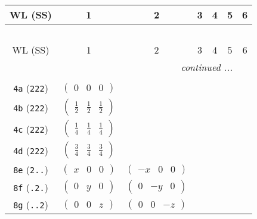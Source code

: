 \documentclass[fleqn,9pt,landscape]{jsarticle}
\begin{document}
\begin{center}
\renewcommand{\arraystretch}{1.2}
\begin{longtable}{ccccccc}
 \hline \hline
WL (SS) & 1 & 2 & 3 & 4 & 5 & 6 \\ \hline \endfirsthead

\multicolumn{6}{l}{\tablename\ \thetable{}} \\
 \hline \hline
WL (SS) & 1 & 2 & 3 & 4 & 5 & 6 \\ \hline \endhead

 \hline \hline
\multicolumn{6}{r}{\footnotesize\it continued ...} \\ \endfoot

 \hline \hline
\multicolumn{6}{r}{} \\ \endlastfoot

{\tt 4a} ({\tt 222}) & $ \begin{pmatrix} 0 & 0 & 0 \end{pmatrix} $ & $  $ & $  $ & $  $ \\ \hline
{\tt 4b} ({\tt 222}) & $ \begin{pmatrix} \frac{1}{2} & \frac{1}{2} & \frac{1}{2} \end{pmatrix} $ & $  $ & $  $ & $  $ \\ \hline
{\tt 4c} ({\tt 222}) & $ \begin{pmatrix} \frac{1}{4} & \frac{1}{4} & \frac{1}{4} \end{pmatrix} $ & $  $ & $  $ & $  $ \\ \hline
{\tt 4d} ({\tt 222}) & $ \begin{pmatrix} \frac{3}{4} & \frac{3}{4} & \frac{3}{4} \end{pmatrix} $ & $  $ & $  $ & $  $ \\ \hline
{\tt 8e} ({\tt 2..}) & $ \begin{pmatrix} x & 0 & 0 \end{pmatrix} $ & $ \begin{pmatrix} - x & 0 & 0 \end{pmatrix} $ & $  $ & $  $ \\ \hline
{\tt 8f} ({\tt .2.}) & $ \begin{pmatrix} 0 & y & 0 \end{pmatrix} $ & $ \begin{pmatrix} 0 & - y & 0 \end{pmatrix} $ & $  $ & $  $ \\ \hline
{\tt 8g} ({\tt ..2}) & $ \begin{pmatrix} 0 & 0 & z \end{pmatrix} $ & $ \begin{pmatrix} 0 & 0 & - z \end{pmatrix} $ & $  $ & $  $ \\ \hline

\end{longtable}
\end{center}
\end{document}
